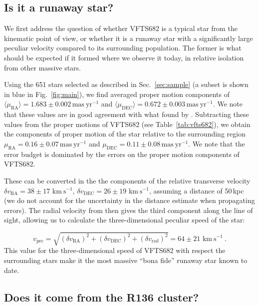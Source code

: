 \documentclass[apjl,twocolumn]{emulateapj}
\newcommand{\kms}{{\,\mathrm{km\ s^{-1}}}}
\DeclareRobustCommand{\Figref}[1]{Fig.~\ref{#1}}
\DeclareRobustCommand{\Tabref}[1]{Table~\ref{#1}}
\DeclareRobustCommand{\Secref}[1]{Sec.~\ref{#1}}
\begin{document}
\subsection{Is it a runaway star?}
\label{sec:runaway}
We first address the question of whether VFTS682 is a typical star
from the kinematic point of view, or whether it is a runaway star with
a significantly large peculiar velocity compared to its surrounding population. The former is what should
be expected if it formed where we observe it today, in relative
isolation from other massive stars.

Using the 651 stars selected as described in \Secref{sec:sample} (a
subset is shown in blue in \Figref{fig:main}), we find averaged proper motion components of
$\langle\mu_\mathrm{RA}\rangle = 1.683\pm0.002\,\mathrm{mas\ yr^{-1}}$ and
$\langle\mu_\mathrm{DEC}\rangle =
0.672\pm0.003\,\mathrm{mas\ yr^{-1}}$. We note that these values are
in good agreement with what found by \cite{lennon:18}. Subtracting these values from the
proper motions of VFTS682 (see \Tabref{tab:vfts682}), we obtain the
components of proper motion of the star relative to the surrounding region
$\mu_\mathrm{RA} = 0.16\pm 0.07\,\mathrm{mas\ yr^{-1}}$ and $\mu_\mathrm{DEC} =
0.11\pm 0.08\,\mathrm{mas\ yr^{-1}}$. We note that the error budget is
dominated by the errors on the proper motion components of VFTS682.

These can be converted in the
the components of the relative transverse velocity $\delta v_\mathrm{RA}=38\pm17\,\kms$,
$\delta v_\mathrm{DEC}=26\pm19\,\kms$, assuming a distance of
50\,kpc (we do not account for the uncertainty in the distance
estimate when propagating errors). The radial velocity from
\cite{bestenlehner:11} then gives the third component along
the line of sight, allowing us to calculate the three-dimensional
peculiar speed of the star:

\begin{equation}
  \label{eq:speed_around}
  v_\mathrm{pec} = \sqrt{\left(\delta v_\mathrm{RA}\right)^2
    +\left(\delta v_\mathrm{DEC}\right)^2+\left(\delta
      v_\mathrm{rad}\right)^2} = 64 \pm 21 
  \, \kms \ .
\end{equation}
This value for the three-dimensional speed of VFTS682 with respect the
surrounding stars make it the most massive ``bona fide'' runaway star
known to date.

\subsection{Does it come from the R136 cluster?}
\label{sec:r136_origin}
\end{document}
